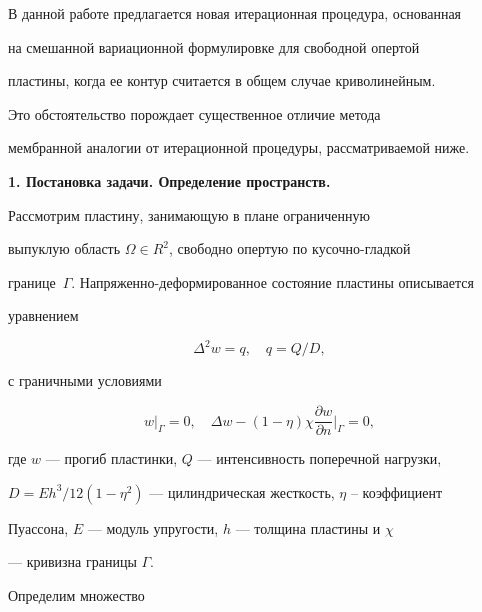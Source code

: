  


В данной работе предлагается новая итерационная процедура, основанная 


на смешанной вариационной формулировке для свободной опертой 


пластины, когда ее контур считается в общем случае криволинейным. 


Это обстоятельство порождает существенное отличие метода 


мембранной аналогии от итерационной процедуры, рассматриваемой ниже. 


\medskip 


\addtocounter{section}{1} 


\setcounter{equation}{0} 


 


 


{\bf 1. Постановка задачи. Определение пространств.} 


Рассмотрим пластину, занимающую в плане ограниченную 


выпуклую область $\Omega\in R^2$, свободно опертую по кусочно-гладкой 


границе~$\Gamma$. Напряженно-деформированное состояние пластины описывается 


уравнением 


\begin{equation} 


\Delta^2w=q,\quad q=Q/D, 


\end{equation} 


с граничными условиями 


\begin{equation} 


w|_\Gamma=0,\quad \Delta w-(1-\eta)\chi\frac{\partial w}{\partial n} 


\Big|_\Gamma=0, 


\end{equation} 


где $w$ --- прогиб пластинки, $Q$ --- интенсивность поперечной нагрузки, 


$D=Eh^3/12(1-\eta^2)$ --- цилиндрическая жесткость, $\eta$ -- коэффициент 


Пуассона, $E$ --- модуль упругости, $h$ --- толщина пластины и $\chi$ 


--- кривизна границы $\Gamma$. 


 


Определим множество 


